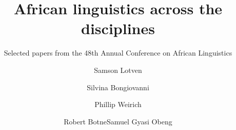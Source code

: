\title{African linguistics across the disciplines}  %
\subtitle{Selected papers from the 48th Annual Conference on African Linguistics}
\BackBody{
 }
\author{Samson Lotven\and   Silvina Bongiovanni\and   Phillip Weirich\and   Robert Botne\lastand   Samuel Gyasi Obeng   }
\renewcommand{\lsISBNdigital}{000-0-000000-00-0}
\renewcommand{\lsISBNhardcover}{000-0-000000-00-0}
\renewcommand{\lsISBNsoftcover}{000-0-000000-00-0}
\renewcommand{\lsISBNsoftcoverus}{000-0-000000-00-0}
\renewcommand{\lsSeries}{calseries} %
\renewcommand{\lsSeriesNumber}{} %
